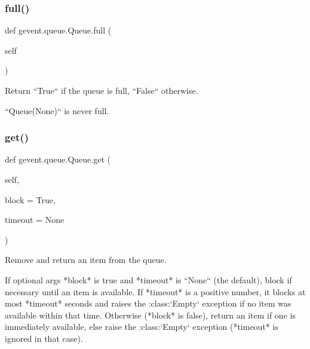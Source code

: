 \subsubsection{\texorpdfstring{full()}{full()}}
{\footnotesize\ttfamily def gevent.\+queue.\+Queue.\+full (\begin{DoxyParamCaption}\item[{}]{self }\end{DoxyParamCaption})}

\begin{DoxyVerb}Return ``True`` if the queue is full, ``False`` otherwise.

``Queue(None)`` is never full.
\end{DoxyVerb}
 \mbox{\label{classgevent_1_1queue_1_1_queue_a27dec76bb19989ba472c90d481b242e1}} 
\subsubsection{\texorpdfstring{get()}{get()}}
{\footnotesize\ttfamily def gevent.\+queue.\+Queue.\+get (\begin{DoxyParamCaption}\item[{}]{self,  }\item[{}]{block = {\ttfamily True},  }\item[{}]{timeout = {\ttfamily None} }\end{DoxyParamCaption})}

\begin{DoxyVerb}Remove and return an item from the queue.

If optional args *block* is true and *timeout* is ``None`` (the default),
block if necessary until an item is available. If *timeout* is a positive number,
it blocks at most *timeout* seconds and raises the :class:`Empty` exception
if no item was available within that time. Otherwise (*block* is false), return
an item if one is immediately available, else raise the :class:`Empty` exception
(*timeout* is ignored in that case).
\end{DoxyVerb}
 \mbox{\label{classgevent_1_1queue_1_1_queue_af9b599f2a0608b43dd44d5ecff686c7c}} 

